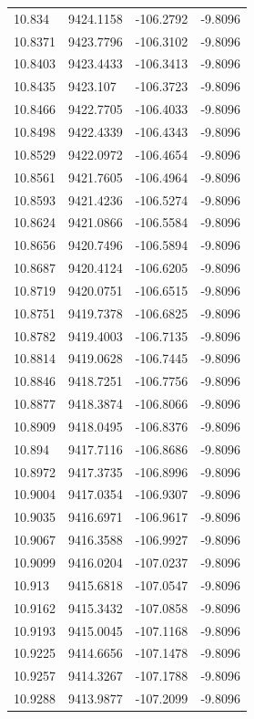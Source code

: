 \begin{table}[H]
\begin{tabular}{llll}
10.834 & 9424.1158 & -106.2792 & -9.8096 \\
10.8371 & 9423.7796 & -106.3102 & -9.8096 \\
10.8403 & 9423.4433 & -106.3413 & -9.8096 \\
10.8435 & 9423.107 & -106.3723 & -9.8096 \\
10.8466 & 9422.7705 & -106.4033 & -9.8096 \\
10.8498 & 9422.4339 & -106.4343 & -9.8096 \\
10.8529 & 9422.0972 & -106.4654 & -9.8096 \\
10.8561 & 9421.7605 & -106.4964 & -9.8096 \\
10.8593 & 9421.4236 & -106.5274 & -9.8096 \\
10.8624 & 9421.0866 & -106.5584 & -9.8096 \\
10.8656 & 9420.7496 & -106.5894 & -9.8096 \\
10.8687 & 9420.4124 & -106.6205 & -9.8096 \\
10.8719 & 9420.0751 & -106.6515 & -9.8096 \\
10.8751 & 9419.7378 & -106.6825 & -9.8096 \\
10.8782 & 9419.4003 & -106.7135 & -9.8096 \\
10.8814 & 9419.0628 & -106.7445 & -9.8096 \\
10.8846 & 9418.7251 & -106.7756 & -9.8096 \\
10.8877 & 9418.3874 & -106.8066 & -9.8096 \\
10.8909 & 9418.0495 & -106.8376 & -9.8096 \\
10.894 & 9417.7116 & -106.8686 & -9.8096 \\
10.8972 & 9417.3735 & -106.8996 & -9.8096 \\
10.9004 & 9417.0354 & -106.9307 & -9.8096 \\
10.9035 & 9416.6971 & -106.9617 & -9.8096 \\
10.9067 & 9416.3588 & -106.9927 & -9.8096 \\
10.9099 & 9416.0204 & -107.0237 & -9.8096 \\
10.913 & 9415.6818 & -107.0547 & -9.8096 \\
10.9162 & 9415.3432 & -107.0858 & -9.8096 \\
10.9193 & 9415.0045 & -107.1168 & -9.8096 \\
10.9225 & 9414.6656 & -107.1478 & -9.8096 \\
10.9257 & 9414.3267 & -107.1788 & -9.8096 \\
10.9288 & 9413.9877 & -107.2099 & -9.8096 \\

\end{tabular}
\end{table}
